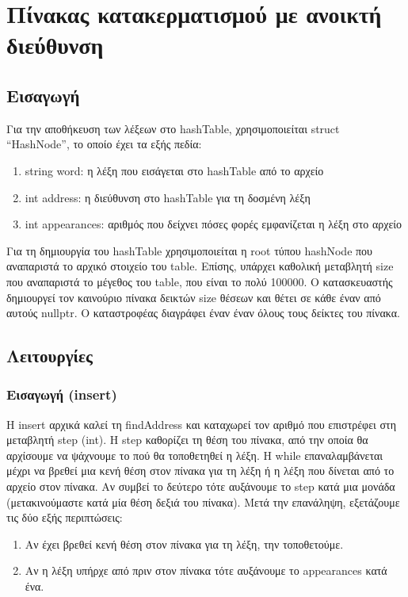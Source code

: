 \chapter{Πίνακας κατακερματισμού με ανοικτή διεύθυνση}

\section{Εισαγωγή}

Για την αποθήκευση των λέξεων στο hashTable, χρησιμοποιείται struct “HashNode”, το οποίο έχει τα εξής πεδία:
\begin{enumerate}[-]
    \item string word: η λέξη που εισάγεται στο hashTable από το αρχείο
    \item int address: η  διεύθυνση στο hashTable για τη δοσμένη λέξη
    \item int appearances: αριθμός που δείχνει πόσες φορές εμφανίζεται η λέξη στο αρχείο
\end{enumerate}

Για τη δημιουργία του hashTable χρησιμοποιείται η root τύπου hashNode που αναπαριστά το αρχικό στοιχείο του table. Επίσης, υπάρχει καθολική μεταβλητή size που αναπαριστά το μέγεθος του table, που είναι το πολύ 100000.
Ο κατασκευαστής δημιουργεί τον καινούριο πίνακα δεικτών size θέσεων και θέτει σε κάθε έναν από αυτούς nullptr.
Ο καταστροφέας διαγράφει έναν έναν όλους τους δείκτες του πίνακα.


\section{Λειτουργίες}

\subsection{Eισαγωγή (insert)}

Η insert αρχικά καλεί τη findAddress και καταχωρεί τον αριθμό που επιστρέφει στη μεταβλητή step (int). Η step καθορίζει τη θέση του πίνακα, από την οποία θα αρχίσουμε να ψάχνουμε το πού θα τοποθετηθεί η λέξη. Η while επαναλαμβάνεται μέχρι να βρεθεί μια κενή θέση στον πίνακα για τη λέξη ή η λέξη που δίνεται από το αρχείο στον  πίνακα. Αν συμβεί το δεύτερο τότε αυξάνουμε το step κατά μια μονάδα (μετακινούμαστε κατά μία θέση δεξιά του πίνακα). Μετά την επανάληψη, εξετάζουμε τις δύο εξής περιπτώσεις:

\begin{enumerate}[-]
    \item Αν έχει βρεθεί κενή θέση στον πίνακα για τη λέξη, την τοποθετούμε.
    \item Αν η λέξη υπήρχε από πριν στον πίνακα τότε αυξάνουμε το appearances κατά ένα.

\end{enumerate}


